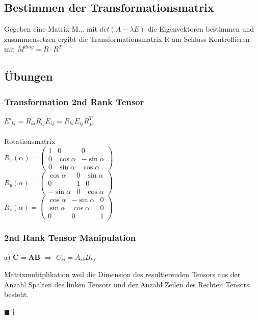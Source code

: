 \documentclass[a4paper]{scrartcl}
\newcommand{\qed}{\begin{flushright}
$\blacksquare \dagger$ \end{flushright}}
\begin{document}
\subsection{Bestimmen der Transformationsmatrix}

Gegeben eine Matrix M... mit $det(A-\lambda E)$ die Eigenvektoren bestimmen und zusammensetzen ergibt die Transformationsmatrix R am Schluss Kontrollieren mit $M^{diag}=R \cdot R^T$



\subsection{Übungen}
\subsubsection{Transformation 2nd Rank Tensor}
$E'_{kl}=R_{ki}R_{lj}E_{ij}=R_{ki}E_{ij}R_{jl}^T$
\\
\\
Rotationsmatrix
\\
$R_x(\alpha) = \begin{pmatrix} 
1 &   0         & 0           \\
0 & \cos \alpha & -\sin \alpha \\
0 & \sin \alpha &  \cos \alpha
\end{pmatrix} $
\\
$R_y(\alpha) = \begin{pmatrix} 
\cos \alpha  & 0 & \sin \alpha \\
   0         & 1 &  0          \\
-\sin \alpha & 0 & \cos \alpha
\end{pmatrix} $
\\
$R_z(\alpha) = \begin{pmatrix} 
\cos \alpha & -\sin \alpha & 0 \\
\sin \alpha &  \cos \alpha & 0 \\            
   0        &  0           & 1
\end{pmatrix}$
\\

\subsubsection{2nd Rank Tensor Manipulation}

a) $\mathbf{C}=\mathbf{AB}$ $\Rightarrow$ $C_{ij}=A_{ik}B_{kj}$

Matrixmulitplikation weil die Dimension des resultierenden Tensors aus der
Anzahl Spalten des linken Tensors und der Anzahl Zeilen des Rechten Tensors
besteht. \qed
\end{document}
